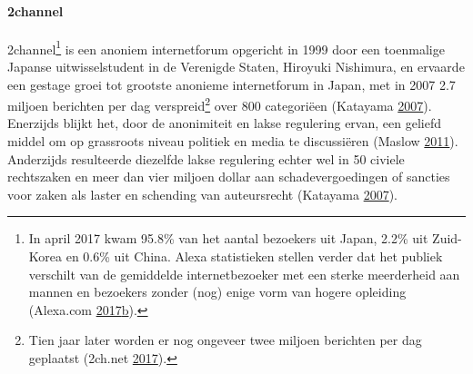 \documentclass[10.5pt,dutch,]{article}
\let\oldparagraph\paragraph
\renewcommand{\paragraph}[1]{\oldparagraph{#1}\mbox{}}
\begin{document}
\paragraph{2channel}\label{channel}

2channel\footnote{In april 2017 kwam 95.8\% van het aantal bezoekers uit
  Japan, 2.2\% uit Zuid-Korea en 0.6\% uit China. Alexa statistieken
  stellen verder dat het publiek verschilt van de gemiddelde
  internetbezoeker met een sterke meerderheid aan mannen en bezoekers
  zonder (nog) enige vorm van hogere opleiding (Alexa.com
  \protect\hyperlink{ref-alexa.comux5ftopux5f2017}{2017}\protect\hyperlink{ref-alexa.comux5ftopux5f2017}{b}).}
is een anoniem internetforum opgericht in 1999 door een toenmalige
Japanse uitwisselstudent in de Verenigde Staten, Hiroyuki Nishimura, en
ervaarde een gestage groei tot grootste anonieme internetforum in Japan,
met in 2007 2.7 miljoen berichten per dag verspreid\footnote{Tien jaar
  later worden er nog ongeveer twee miljoen berichten per dag geplaatst
  (2ch.net \protect\hyperlink{ref-2ch.netux5fsuzumeux5f2017}{2017}).}
over 800 categoriëen (Katayama
\protect\hyperlink{ref-katayamaux5f2-channelux5f2007}{2007}). Enerzijds
blijkt het, door de anonimiteit en lakse regulering ervan, een geliefd
middel om op grassroots niveau politiek en media te discussiëren (Maslow
\protect\hyperlink{ref-maslowux5fnationalismux5f2011-1}{2011}).
Anderzijds resulteerde diezelfde lakse regulering echter wel in 50
civiele rechtszaken en meer dan vier miljoen dollar aan
schadevergoedingen of sancties voor zaken als laster en schending van
auteursrecht (Katayama
\protect\hyperlink{ref-katayamaux5f2-channelux5f2007}{2007}).
\end{document}
